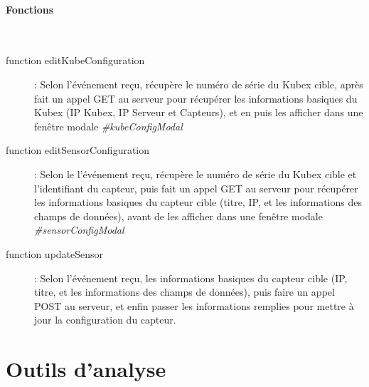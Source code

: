 \documentclass[a4paper]{report}
\begin{document}
\paragraph{Fonctions}~\\
\begin{description}
	\item[function editKubeConfiguration]: Selon l'événement reçu, récupère le numéro de série du Kubex cible, après fait un appel GET au serveur pour récupérer les informations basiques du Kubex (IP Kubex, IP Serveur et Capteurs), et en puis les afficher dans une fenêtre modale \emph{\#kubeConfigModal}
	
	\item[function editSensorConfiguration]: Selon le l'événement reçu, récupère le numéro de série du Kubex cible et l'identifiant du capteur, puis fait un appel GET au serveur pour récupérer les informations basiques du capteur cible (titre, IP, et les informations des champs de données), avant de les afficher dans une fenêtre modale \emph{\#sensorConfigModal}
	
	\item[function updateSensor]: Selon l'événement reçu, les informations basiques du capteur cible (IP, titre, et les informations des champs de données), puis faire un appel POST au serveur, et enfin passer les informations remplies pour mettre à jour la configuration du capteur.
\end{description}



\section{Outils d'analyse}
\label{sec:scripts}
\end{document}
